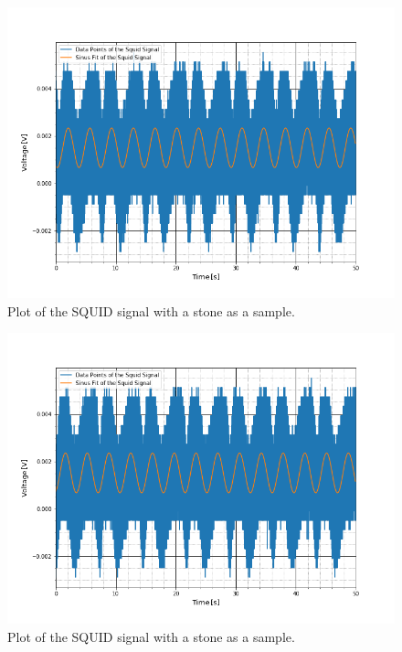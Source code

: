 \begin{figure}[ht]
	\includegraphics[scale=0.5]{Bild/P4_2}
	\centering
	\caption[SQUID signal of a Stone 2]{Plot of the SQUID signal with a stone as a sample.}
\end{figure}
\begin{figure}[ht]
	\includegraphics[scale=0.5]{Bild/P4_3}
	\centering
	\caption[SQUID signal of a Stone 3]{Plot of the SQUID signal with a stone as a sample.}
\end{figure}
